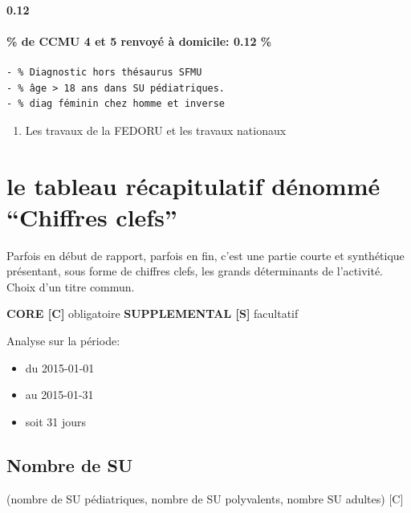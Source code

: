 \documentclass[]{article}
\begin{document}
\paragraph{0.12}\label{section}

\paragraph{\% de CCMU 4 et 5 renvoyé à domicile: 0.12
\%}\label{de-ccmu-4-et-5-renvoye-a-domicile-0.12}

\begin{verbatim}
- % Diagnostic hors thésaurus SFMU
- % âge > 18 ans dans SU pédiatriques.
- % diag féminin chez homme et inverse
\end{verbatim}

\begin{enumerate}
\def\labelenumi{\alph{enumi}.}
\setcounter{enumi}{3}
\itemsep1pt\parskip0pt
\item
  Les travaux de la FEDORU et les travaux nationaux
\end{enumerate}

\section{le tableau récapitulatif dénommé ``Chiffres
clefs''}\label{le-tableau-recapitulatif-denomme-chiffres-clefs}

Parfois en début de rapport, parfois en fin, c'est une partie courte et
synthétique présentant, sous forme de chiffres clefs, les grands
déterminants de l'activité. Choix d'un titre commun.

\textbf{CORE {[}C{]}} obligatoire \textbf{SUPPLEMENTAL {[}S{]}}
facultatif

Analyse sur la période:

\begin{itemize}
\itemsep1pt\parskip0pt
\item
  du 2015-01-01
\item
  au 2015-01-31
\item
  soit 31 jours
\end{itemize}

\subsection{Nombre de SU}\label{nombre-de-su}

(nombre de SU pédiatriques, nombre de SU polyvalents, nombre SU adultes)
{[}C{]}
\end{document}
